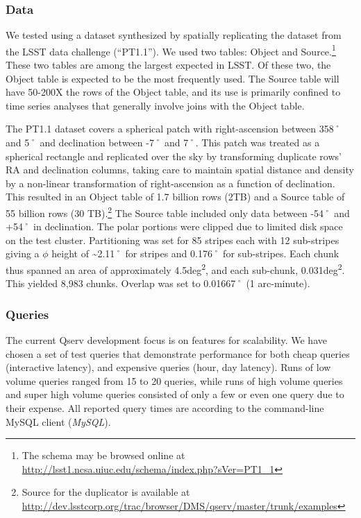 \documentclass[DM,lsstdraft,toc]{lsstdoc}
\begin{document}
\subsubsection{Data}\label{data}

We tested using a dataset synthesized by spatially replicating the
dataset from the LSST data challenge (``PT1.1''). We used two tables:
Object and Source.\footnote{The schema may be browsed online at
  \url{http://lsst1.ncsa.uiuc.edu/schema/index.php?sVer=PT1_1}} These
two tables are among the largest expected in LSST. Of these two, the
Object table is expected to be the most frequently used. The Source
table will have 50-200X the rows of the Object table, and its use is
primarily confined to time series analyses that generally involve joins
with the Object table.

The PT1.1 dataset covers a spherical patch with right-ascension between
358˚ and 5˚ and declination between -7˚ and 7˚. This patch was treated
as a spherical rectangle and replicated over the sky by transforming
duplicate rows' RA and declination columns, taking care to maintain
spatial distance and density by a non-linear transformation of
right-ascension as a function of declination. This resulted in an Object
table of 1.7 billion rows (2TB) and a Source table of 55 billion rows
(30 TB).\footnote{Source for the duplicator is available at
  \url{http://dev.lsstcorp.org/trac/browser/DMS/qserv/master/trunk/examples}}
The Source table included only data between -54˚ and +54˚ in
declination. The polar portions were clipped due to limited disk space
on the test cluster. Partitioning was set for 85 stripes each with 12
sub-stripes giving a $\phi$ height of \textasciitilde{}2.11˚ for stripes and
0.176˚ for sub-stripes. Each chunk thus spanned an area of approximately
4.5deg\textsuperscript{2}, and each sub-chunk,
0.031deg\textsuperscript{2}. This yielded 8,983 chunks. Overlap was set
to 0.01667˚ (1 arc-minute).

\subsubsection{Queries}\label{queries}

The current Qserv development focus is on features for scalability. We
have chosen a set of test queries that demonstrate performance for both
cheap queries (interactive latency), and expensive queries (hour, day
latency). Runs of low volume queries ranged from 15 to 20 queries, while
runs of high volume queries and super high volume queries consisted of
only a few or even one query due to their expense. All reported query
times are according to the command-line MySQL client (\emph{MySQL}).
\end{document}
